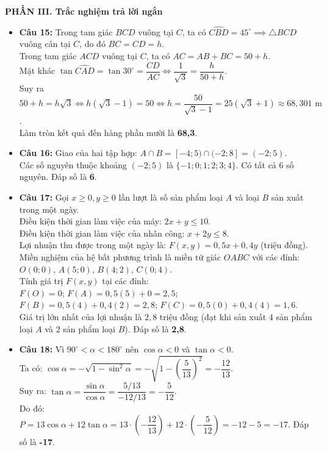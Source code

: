 \documentclass[12pt,a4paper]{article}
\begin{document}
\vspace{0.15cm}
\textbf{PHẦN III. Trắc nghiệm trả lời ngắn}
\begin{itemize}[leftmargin=0.6cm, itemsep=1.5pt, topsep=1pt]
    \item \textbf{Câu 15:} Trong tam giác $BCD$ vuông tại $C$, ta có $\widehat{CBD} = 45^\circ \implies \triangle BCD$ vuông cân tại $C$, do đó $BC = CD = h$.\\
    Trong tam giác $ACD$ vuông tại $C$, ta có $AC = AB + BC = 50 + h$.\\
    Mặt khác $\tan \widehat{CAD} = \tan 30^\circ = \dfrac{CD}{AC} \iff \dfrac{1}{\sqrt{3}} = \dfrac{h}{50 + h}$.\\
    Suy ra $50 + h = h\sqrt{3} \iff h(\sqrt{3} - 1) = 50 \iff h = \dfrac{50}{\sqrt{3} - 1} = 25(\sqrt{3} + 1) \approx 68{,}301\text{ m}$.\\
    Làm tròn kết quả đến hàng phần mười là \textbf{68,3}.
    \item \textbf{Câu 16:} Giao của hai tập hợp: $A \cap B = [-4; 5) \cap (-2; 8] = (-2; 5)$.\\
    Các số nguyên thuộc khoảng $(-2; 5)$ là $\{-1; 0; 1; 2; 3; 4\}$. Có tất cả $6$ số nguyên. Đáp số là \textbf{6}.
    \item \textbf{Câu 17:} Gọi $x \ge 0, y \ge 0$ lần lượt là số sản phẩm loại $A$ và loại $B$ sản xuất trong một ngày.\\
    Điều kiện thời gian làm việc của máy: $2x + y \le 10$.\\
    Điều kiện thời gian làm việc của nhân công: $x + 2y \le 8$.\\
    Lợi nhuận thu được trong một ngày là: $F(x, y) = 0{,}5x + 0{,}4y$ (triệu đồng).\\
    Miền nghiệm của hệ bất phương trình là miền tứ giác $OABC$ với các đỉnh: $O(0; 0)$, $A(5; 0)$, $B(4; 2)$, $C(0; 4)$.\\
    Tính giá trị $F(x, y)$ tại các đỉnh:\\
    $F(O) = 0$; $F(A) = 0{,}5(5) + 0 = 2{,}5$; $F(B) = 0{,}5(4) + 0{,}4(2) = 2{,}8$; $F(C) = 0{,}5(0) + 0{,}4(4) = 1{,}6$.\\
    Giá trị lớn nhất của lợi nhuận là $2{,}8$ triệu đồng (đạt khi sản xuất $4$ sản phẩm loại $A$ và $2$ sản phẩm loại $B$). Đáp số là \textbf{2,8}.
    \item \textbf{Câu 18:} Vì $90^\circ < \alpha < 180^\circ$ nên $\cos \alpha < 0$ và $\tan \alpha < 0$.\\
    Ta có: $\cos \alpha = -\sqrt{1 - \sin^2 \alpha} = -\sqrt{1 - \left(\dfrac{5}{13}\right)^2} = -\dfrac{12}{13}$.\\
    Suy ra: $\tan \alpha = \dfrac{\sin \alpha}{\cos \alpha} = \dfrac{5/13}{-12/13} = -\dfrac{5}{12}$.\\
    Do đó: $P = 13\cos \alpha + 12\tan \alpha = 13 \cdot \left(-\dfrac{12}{13}\right) + 12 \cdot \left(-\dfrac{5}{12}\right) = -12 - 5 = -17$. Đáp số là \textbf{-17}.
\end{itemize}
\end{document}
